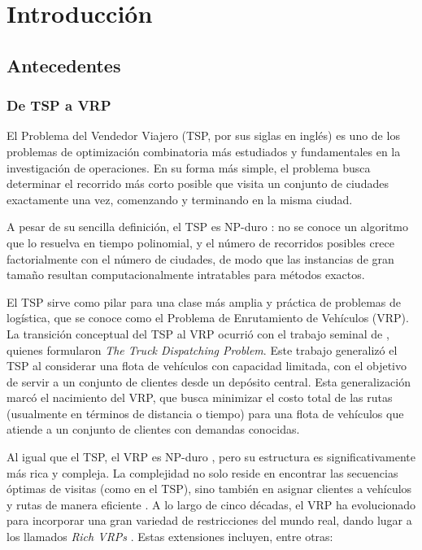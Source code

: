 \documentclass[12pt,letterpaper,oneside]{book}
\begin{document}
	\listoffigures
	
	\listoftables
	
	\mainmatter
	
	
	\chapter{Introducción}

\section{Antecedentes}

\subsection{De TSP a VRP}
El Problema del Vendedor Viajero (TSP, por sus siglas en inglés) es uno de los problemas de 
optimización combinatoria más estudiados y fundamentales en la investigación de operaciones. 
En su forma más simple, el problema busca determinar el recorrido más corto posible que visita 
un conjunto de ciudades exactamente una vez, comenzando y terminando en la misma ciudad. 

A pesar de su sencilla definición, el TSP es NP-duro \citep{Lenstra1981}: no se conoce un algoritmo
que lo resuelva en tiempo polinomial, y el número de recorridos posibles crece factorialmente con el
número de ciudades, de modo que las instancias de gran tamaño resultan computacionalmente intratables
para métodos exactos.

El TSP sirve como pilar para una clase más amplia y práctica de problemas de logística,
que se conoce como el Problema de Enrutamiento de Vehículos (VRP). La transición conceptual del TSP al VRP
ocurrió con el trabajo seminal de \citet{Dantzig1959}, quienes formularon \textit{The Truck Dispatching Problem}. Este trabajo generalizó el TSP al considerar una flota de vehículos con capacidad
limitada, con el objetivo de servir a un conjunto de clientes desde un depósito central. 
Esta generalización marcó el nacimiento del VRP, que busca minimizar el costo total de las 
rutas (usualmente en términos de distancia o tiempo) para una flota de vehículos que atiende 
a un conjunto de clientes con demandas conocidas.

Al igual que el TSP, el VRP es NP-duro \citep{Lenstra1981}, pero su estructura es significativamente
más rica y compleja. La complejidad no solo reside en encontrar las secuencias óptimas de visitas 
(como en el TSP), sino también en asignar clientes a vehículos y rutas de manera eficiente \citep{Caceres-Cruz2014}. A lo 
largo de cinco décadas, el VRP ha evolucionado para incorporar una gran variedad de restricciones 
del mundo real, dando lugar a los llamados \textit{Rich VRPs} \citep{Caceres-Cruz2014}. Estas extensiones
incluyen, entre otras:
\end{document}
